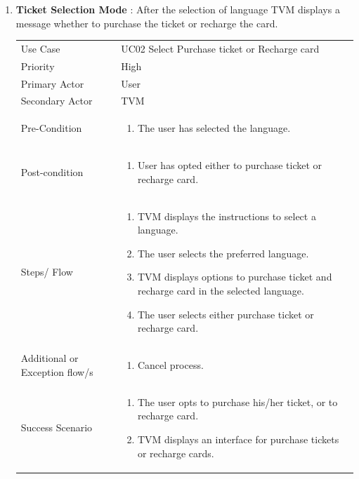 \documentclass[15pt]{article}
\begin{document}
\begin{enumerate}[leftmargin=2em, itemsep=0pt, parsep=0pt, , font=\Large\bfseries]
\begin{tabularx}{1\textwidth} { 
  | >{\raggedright\arraybackslash}X 
  | >{\raggedright\arraybackslash}X 
  | }
\hline
\end{tabularx}


\newpage
\item {\Large\bfseries{Ticket Selection Mode}} : After the selection of language TVM displays a message whether to purchase the ticket or recharge the card.
\newline
\newline
\begin{tabularx}{1\textwidth} { 
  | >{\raggedright\arraybackslash}X 
  | >{\raggedright\arraybackslash}X 
  | }
 \hline
 Use Case & UC02 Select Purchase ticket or Recharge card \\
 Priority & High \\
 Primary Actor  & User \\
 Secondary Actor  & TVM \\

 Pre-Condition  & 
 \begin{enumerate}
  \item The user has selected the language.
  \end{enumerate}
  \\
  
   Post-condition  & \begin{enumerate}
  \item User has opted either to purchase ticket or recharge card.
  \end{enumerate}
  \\
  
  Steps/ Flow  & \begin{enumerate}
  \item TVM displays the instructions to select a language.
  \item The user selects the preferred language.
  \item TVM displays options to purchase ticket and recharge card in the selected language.
  \item  The user selects either purchase ticket or recharge card.
  \end{enumerate}
  \\
  
   Additional or Exception flow/s  & \begin{enumerate}
  \item  Cancel process.
  \end{enumerate}
  \\
    
   Success Scenario  & \begin{enumerate}
  \item  The user opts to purchase his/her ticket, or to recharge card.
  \item  TVM displays an interface for purchase tickets or recharge cards.
  \end{enumerate}
  \\


\end{tabularx}
\end{enumerate}
\end{document}
